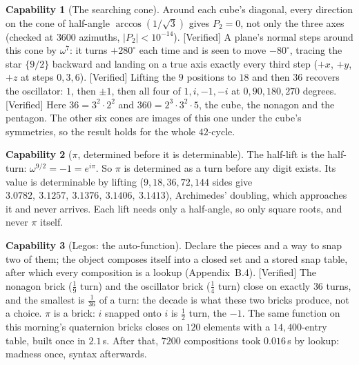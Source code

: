 \documentclass[11pt]{article}
\newcommand{\verified}{\textsf{\small\textcolor{verif}{[Verified]}}}
\theoremstyle{definition}\newtheorem{claim}{Capability}
\theoremstyle{remark}
\begin{document}
\begin{claim}[The searching cone]\label{c:cone}
Around each cube's diagonal, every direction on the cone of half-angle $\arccos(1/\sqrt3)$ gives $P_2=0$, not only the three axes (checked at $3600$ azimuths, $|P_2|<10^{-14}$). \verified{} A plane's normal steps around this cone by $\omega^7$: it turns $+280^\circ$ each time and is seen to move $-80^\circ$, tracing the star $\{9/2\}$ backward and landing on a true axis exactly every third step ($+x$, $+y$, $+z$ at steps $0,3,6$). \verified{} Lifting the $9$ positions to $18$ and then $36$ recovers the oscillator: $1$, then $\pm1$, then all four of $1,i,-1,-i$ at $0,90,180,270$ degrees. \verified{} Here $36=3^2\cdot2^2$ and $360=2^3\cdot3^2\cdot5$, the cube, the nonagon and the pentagon. The other six cones are images of this one under the cube's symmetries, so the result holds for the whole $42$-cycle.
\end{claim}

\begin{claim}[$\pi$, determined before it is determinable]\label{c:pi}
The half-lift is the half-turn: $\omega^{9/2}=-1=e^{i\pi}$. So $\pi$ is determined as a turn before any digit exists. Its value is determinable by lifting ($9,18,36,72,144$ sides give $3.0782,\ 3.1257,\ 3.1376,\ 3.1406,\ 3.1413$), Archimedes' doubling, which approaches it and never arrives. Each lift needs only a half-angle, so only square roots, and never $\pi$ itself.
\end{claim}


\begin{claim}[Legos: the auto-function]\label{c:lego}
Declare the pieces and a way to snap two of them; the object composes itself into a closed set and a stored snap table, after which every composition is a lookup (Appendix~B.4). \verified{} The nonagon brick ($\tfrac19$ turn) and the oscillator brick ($\tfrac14$ turn) close on exactly $36$ turns, and the smallest is $\tfrac1{36}$ of a turn: the decade is what these two bricks produce, not a choice. $\pi$ is a brick: $i$ snapped onto $i$ is $\tfrac12$ turn, the $-1$. The same function on this morning's quaternion bricks closes on $120$ elements with a $14{,}400$-entry table, built once in $2.1$\,s. After that, $7200$ compositions took $0.016$\,s by lookup: madness once, syntax afterwards.
\end{claim}
\end{document}
